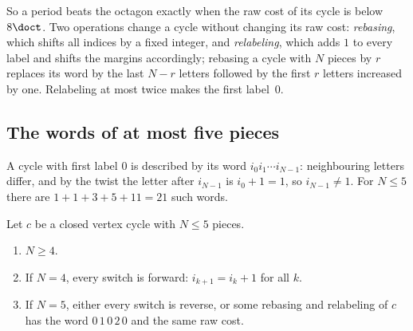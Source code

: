 So a period beats the octagon exactly when the raw cost of its cycle is below $8\doct$.
Two operations change a cycle without changing its raw cost: \emph{rebasing}, which shifts all
indices by a fixed integer, and \emph{relabeling}, which adds $1$ to every label and shifts the
margins accordingly; rebasing a cycle with $N$ pieces by $r$ replaces its word by the last
$N-r$ letters followed by the first $r$ letters increased by one. Relabeling at most twice makes
the first label~$0$.

\subsection{The words of at most five pieces}\label{sec:terminal-words}

A cycle with first label $0$ is described by its word $i_0i_1\cdots i_{N-1}$: neighbouring
letters differ, and by the twist the letter after $i_{N-1}$ is $i_0+1=1$, so $i_{N-1}\ne1$.
For $N\le5$ there are $1+1+3+5+11=21$ such words.

\begin{proposition}\label{prop:terminal-words}
Let $c$ be a closed vertex cycle with $N\le5$ pieces.
\begin{enumerate}
\item $N\ge4$.
\item If $N=4$, every switch is forward: $i_{k+1}=i_k+1$ for all $k$.
\item If $N=5$, either every switch is reverse, or some rebasing and relabeling of $c$ has the
 word $0\,1\,0\,2\,0$ and the same raw cost.
\end{enumerate}
\end{proposition}

